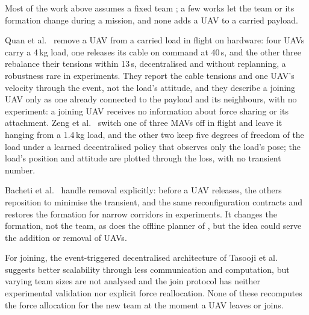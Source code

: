 Most of the work above assumes a fixed team \cite{efficient, wahbaKinodynamicMotionPlanning2024, quan2025swarm}; a few works let the team or its formation change during a mission, and none adds a UAV to a carried payload.

Quan et al.\ \cite{quan2025swarm} remove a UAV from a carried load in flight on hardware: four UAVs carry a 4\,kg load, one releases its cable on command at 40\,s, and the other three rebalance their tensions within 13\,s, decentralised and without replanning, a robustness rare in experiments. They report the cable tensions and one UAV's velocity through the event, not the load's attitude, and they describe a joining UAV only as one already connected to the payload and its neighbours, with no experiment: a joining UAV receives no information about force sharing or its attachment. Zeng et al.\ \cite{zeng2025marl} switch one of three MAVs off in flight and leave it hanging from a 1.4\,kg load, and the other two keep five degrees of freedom of the load under a learned decentralised policy that observes only the load's pose; the load's position and attitude are plotted through the loss, with no transient number.

Bacheti et al.\ \cite{tensionbased} handle removal explicitly: before a UAV releases, the others reposition to minimise the transient, and the same reconfiguration contracts and restores the formation for narrow corridors in experiments. It changes the formation, not the team, as does the offline planner of \cite{wahbaKinodynamicMotionPlanning2024}, but the idea could serve the addition or removal of UAVs.

For joining, the event-triggered decentralised architecture of Tasooji et al.\ \cite{tasoojiCooperativeControlMultiQuadrotors} suggests better scalability through less communication and computation, but varying team sizes are not analysed and the join protocol has neither experimental validation nor explicit force reallocation. None of these recomputes the force allocation for the new team at the moment a UAV leaves or joins.

